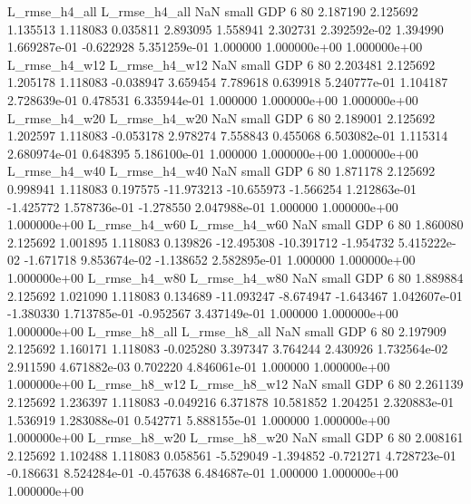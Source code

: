  L_rmse_h4_all  L_rmse_h4_all                   NaN      small      GDP                 6 80 2.187190       2.125692 1.135513       1.118083    0.035811      2.893095      1.558941     2.302731   2.392592e-02  1.394990 1.669287e-01    -0.622928   5.351259e-01            1.000000    1.000000e+00        1.000000e+00
 L_rmse_h4_w12  L_rmse_h4_w12                   NaN      small      GDP                 6 80 2.203481       2.125692 1.205178       1.118083   -0.038947      3.659454      7.789618     0.639918   5.240777e-01  1.104187 2.728639e-01     0.478531   6.335944e-01            1.000000    1.000000e+00        1.000000e+00
 L_rmse_h4_w20  L_rmse_h4_w20                   NaN      small      GDP                 6 80 2.189001       2.125692 1.202597       1.118083   -0.053178      2.978274      7.558843     0.455068   6.503082e-01  1.115314 2.680974e-01     0.648395   5.186100e-01            1.000000    1.000000e+00        1.000000e+00
 L_rmse_h4_w40  L_rmse_h4_w40                   NaN      small      GDP                 6 80 1.871178       2.125692 0.998941       1.118083    0.197575    -11.973213    -10.655973    -1.566254   1.212863e-01 -1.425772 1.578736e-01    -1.278550   2.047988e-01            1.000000    1.000000e+00        1.000000e+00
 L_rmse_h4_w60  L_rmse_h4_w60                   NaN      small      GDP                 6 80 1.860080       2.125692 1.001895       1.118083    0.139826    -12.495308    -10.391712    -1.954732   5.415222e-02 -1.671718 9.853674e-02    -1.138652   2.582895e-01            1.000000    1.000000e+00        1.000000e+00
 L_rmse_h4_w80  L_rmse_h4_w80                   NaN      small      GDP                 6 80 1.889884       2.125692 1.021090       1.118083    0.134689    -11.093247     -8.674947    -1.643467   1.042607e-01 -1.380330 1.713785e-01    -0.952567   3.437149e-01            1.000000    1.000000e+00        1.000000e+00
 L_rmse_h8_all  L_rmse_h8_all                   NaN      small      GDP                 6 80 2.197909       2.125692 1.160171       1.118083   -0.025280      3.397347      3.764244     2.430926   1.732564e-02  2.911590 4.671882e-03     0.702220   4.846061e-01            1.000000    1.000000e+00        1.000000e+00
 L_rmse_h8_w12  L_rmse_h8_w12                   NaN      small      GDP                 6 80 2.261139       2.125692 1.236397       1.118083   -0.049216      6.371878     10.581852     1.204251   2.320883e-01  1.536919 1.283088e-01     0.542771   5.888155e-01            1.000000    1.000000e+00        1.000000e+00
 L_rmse_h8_w20  L_rmse_h8_w20                   NaN      small      GDP                 6 80 2.008161       2.125692 1.102488       1.118083    0.058561     -5.529049     -1.394852    -0.721271   4.728723e-01 -0.186631 8.524284e-01    -0.457638   6.484687e-01            1.000000    1.000000e+00        1.000000e+00
